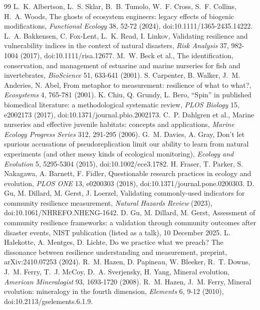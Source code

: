 \documentclass[11pt]{article}
\theoremstyle{definition}
\theoremstyle{remark}
\begin{document}
\begin{thebibliography}{99}
 L.~K. Albertson, L.~S. Sklar, B.~B. Tumolo, W.~F. Cross, S.~F. Collins, H.~A. Woods, The ghosts of ecosystem engineers: legacy effects of biogenic modifications, \emph{Functional Ecology} 38, 52-72 (2024), doi:10.1111/1365-2435.14222.
 L.~A. Bakkensen, C. Fox-Lent, L.~K. Read, I. Linkov, Validating resilience and vulnerability indices in the context of natural disasters, \emph{Risk Analysis} 37, 982-1004 (2017), doi:10.1111/risa.12677.
 M.~W. Beck et al., The identification, conservation, and management of estuarine and marine nurseries for fish and invertebrates, \emph{BioScience} 51, 633-641 (2001).
 S. Carpenter, B. Walker, J.~M. Anderies, N. Abel, From metaphor to measurement: resilience of what to what?, \emph{Ecosystems} 4, 765-781 (2001).
 K. Chiu, Q. Grundy, L. Bero, ``Spin'' in published biomedical literature: a methodological systematic review, \emph{PLOS Biology} 15, e2002173 (2017), doi:10.1371/journal.pbio.2002173.
 C.~P. Dahlgren et al., Marine nurseries and effective juvenile habitats: concepts and applications, \emph{Marine Ecology Progress Series} 312, 291-295 (2006).
 G.~M. Davies, A. Gray, Don't let spurious accusations of pseudoreplication limit our ability to learn from natural experiments (and other messy kinds of ecological monitoring), \emph{Ecology and Evolution} 5, 5295-5304 (2015), doi:10.1002/ece3.1782.
 H. Fraser, T. Parker, S. Nakagawa, A. Barnett, F. Fidler, Questionable research practices in ecology and evolution, \emph{PLOS ONE} 13, e0200303 (2018), doi:10.1371/journal.pone.0200303.
 D. Gu, M. Dillard, M. Gerst, J. Loerzel, Validating commonly-used indicators for community resilience measurement, \emph{Natural Hazards Review} (2023), doi:10.1061/NHREFO.NHENG-1642.
 D. Gu, M. Dillard, M. Gerst, Assessment of community resilience frameworks: a validation through community outcomes after disaster events, NIST publication (listed as a talk), 10 December 2025.
 L. Halekotte, A. Mentges, D. Lichte, Do we practice what we preach? The dissonance between resilience understanding and measurement, preprint, arXiv:2410.07253 (2024).
 R.~M. Hazen, D. Papineau, W. Bleeker, R.~T. Downs, J.~M. Ferry, T.~J. McCoy, D.~A. Sverjensky, H. Yang, Mineral evolution, \emph{American Mineralogist} 93, 1693-1720 (2008).
 R.~M. Hazen, J.~M. Ferry, Mineral evolution: mineralogy in the fourth dimension, \emph{Elements} 6, 9-12 (2010), doi:10.2113/gselements.6.1.9.

\end{thebibliography}
\end{document}
